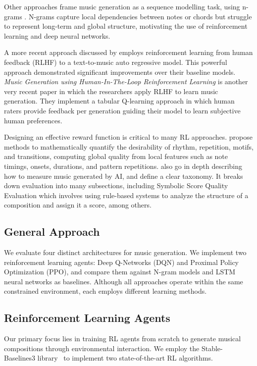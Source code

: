 \documentclass{article}
\begin{document}
Other approaches frame music generation as a sequence modelling task, using n-grams \citep{ngram-paper}. N-grams capture local dependencies between notes or chords but struggle to represent long-term and global structure, motivating the use of reinforcement learning and deep neural networks.

A more recent approach discussed by \citet{music-rlhf} employs reinforcement learning from human feedback (RLHF) \citep{rlhf} to a text-to-music auto regressive model. This powerful approach demonstrated significant improvements over their baseline models. \textit{Music Generation using Human-In-The-Loop Reinforcement Learning} \citep{hitlp-paper} is another very recent paper in which the researchers apply RLHF to learn music generation. They implement a tabular Q-learning \citep{q-learning} approach in which human raters provide feedback per generation guiding their model to learn subjective human preferences.

Designing an effective reward function is critical to many RL approaches. \citet{rhythm-paper} propose methods to mathematically quantify the desirability of rhythm, repetition, motifs, and transitions, computing global quality from local features such as note timings, onsets, durations, and pattern repetitions. \citet{survey_evaluation_metrics} also go in depth describing how to measure music generated by AI, and define a clear taxonomy. It breaks down evaluation into many subsections, including Symbolic Score Quality Evaluation which involves using rule-based systems to analyze the structure of a composition and assign it a score, among others.

\subsection{General Approach}

We evaluate four distinct architectures for music generation. We implement two reinforcement learning agents: Deep Q-Networks (DQN) and Proximal Policy Optimization (PPO), and compare them against N-gram models and LSTM neural networks as baselines. Although all approaches operate within the same constrained environment, each employs different learning methods.

\subsection{Reinforcement Learning Agents}

Our primary focus lies in training RL agents from scratch to generate musical compositions through environmental interaction. We employ the Stable-Baselines3 library~\citep{stable-baselines3} to implement two state-of-the-art RL algorithms.
\end{document}
